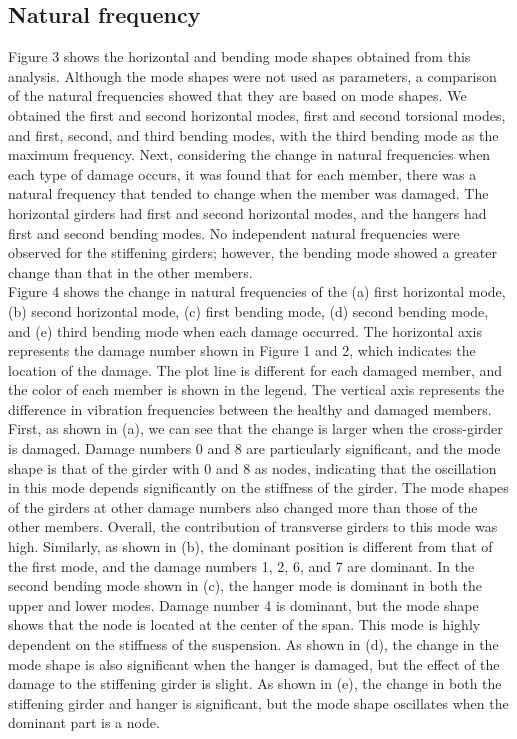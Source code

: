 \documentclass{proc-a4}
\begin{document}
\subsection{Natural frequency}
Figure 3 shows the horizontal and bending mode shapes obtained from this analysis. Although the mode shapes were not used as parameters, a comparison of the natural frequencies showed that they are based on mode shapes. We obtained the first and second horizontal modes, first and second torsional modes, and first, second, and third bending modes, with the third bending mode as the maximum frequency. Next, considering the change in natural frequencies when each type of damage occurs, it was found that for each member, there was a natural frequency that tended to change when the member was damaged. The horizontal girders had first and second horizontal modes, and the hangers had first and second bending modes. No independent natural frequencies were observed for the stiffening girders; however, the bending mode showed a greater change than that in the other members.\\
Figure 4 shows the change in natural frequencies of the (a) first horizontal mode, (b) second horizontal mode, (c) first bending mode, (d) second bending mode, and (e) third bending mode when each damage occurred. The horizontal axis represents the damage number shown in Figure 1 and 2, which indicates the location of the damage. The plot line is different for each damaged member, and the color of each member is shown in the legend. The vertical axis represents the difference in vibration frequencies between the healthy and damaged members. First, as shown in (a), we can see that the change is larger when the cross-girder is damaged. Damage numbers 0 and 8 are particularly significant, and the mode shape is that of the girder with 0 and 8 as nodes, indicating that the oscillation in this mode depends significantly on the stiffness of the girder. The mode shapes of the girders at other damage numbers also changed more than those of the other members. Overall, the contribution of transverse girders to this mode was high. Similarly, as shown in (b), the dominant position is different from that of the first mode, and the damage numbers 1, 2, 6, and 7 are dominant. In the second bending mode shown in (c), the hanger mode is dominant in both the upper and lower modes. Damage number 4 is dominant, but the mode shape shows that the node is located at the center of the span. This mode is highly dependent on the stiffness of the suspension. As shown in (d), the change in the mode shape is also significant when the hanger is damaged, but the effect of the damage to the stiffening girder is slight. As shown in (e), the change in both the stiffening girder and hanger is significant, but the mode shape oscillates when the dominant part is a node. \\
\end{document}

